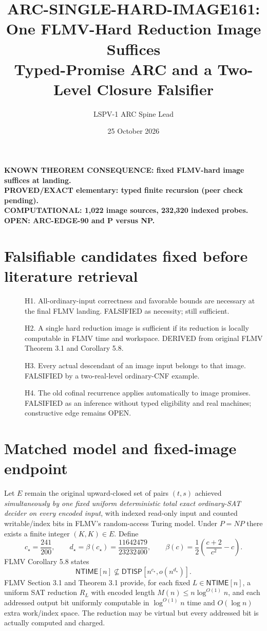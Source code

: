 \documentclass[11pt]{article}
\title{ARC-SINGLE-HARD-IMAGE161: One FLMV-Hard Reduction Image Suffices\\
\large Typed-Promise ARC and a Two-Level Closure Falsifier}
\author{LSPV-1 ARC Spine Lead}\date{25 October 2026}
\newcommand{\NTIME}{\mathsf{NTIME}}
\newcommand{\DTISP}{\mathsf{DTISP}}
\begin{document}
\maketitle
\begin{center}
\textbf{KNOWN THEOREM CONSEQUENCE: fixed FLMV-hard image suffices at landing.}\\
\textbf{PROVED/EXACT elementary: typed finite recursion (peer check pending).}\\
\textbf{COMPUTATIONAL: 1,022 image sources, 232,320 indexed probes.}\\
\textbf{OPEN: ARC-EDGE-90 and P versus NP.}
\end{center}

\section{Falsifiable candidates fixed before literature retrieval}
\begin{description}
\item[] H1. All-ordinary-input correctness and favorable bounds are necessary at the final FLMV landing. FALSIFIED as necessity; still sufficient.
\item[] H2. A single hard reduction image is sufficient if its reduction is locally computable in FLMV time and workspace. DERIVED from original FLMV Theorem 3.1 and Corollary 5.8.
\item[] H3. Every actual descendant of an image input belongs to that image. FALSIFIED by a two-real-level ordinary-CNF example.
\item[] H4. The old cofinal recurrence applies automatically to image promises. FALSIFIED as an inference without typed eligibility and real machines; constructive edge remains OPEN.
\end{description}

\section{Matched model and fixed-image endpoint}
Let $E$ remain the original upward-closed set of pairs $(t,s)$ achieved
\emph{simultaneously by one fixed uniform deterministic total exact ordinary-SAT
decider on every encoded input}, with indexed read-only input and counted
writable/index bits in FLMV's random-access Turing model. Under $P=NP$ there
exists a finite integer $(K,K)\in E$. Define
\[
c_\star=\frac{241}{200},\qquad
d_\star=\beta(c_\star)=\frac{11642479}{23232400},
\qquad\beta(c)=\frac12\left(\frac{c+2}{c^2}-c\right).
\]
FLMV Corollary 5.8 states
\[
\NTIME[n]\not\subseteq\DTISP[n^{c_\star},o(n^{d_\star})].
\tag{1}
\]
FLMV Section 3.1 and Theorem 3.1 provide, for each fixed
$L\in\NTIME[n]$, a uniform SAT reduction $R_L$ with encoded length
$M(n)\le n\log^{O(1)}n$, and each addressed output bit uniformly computable
in $\log^{O(1)}n$ time and $O(\log n)$ extra work/index space. The reduction
may be virtual but every addressed bit is actually computed and charged.
\end{document}
